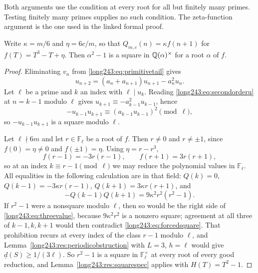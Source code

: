 \documentclass[11pt]{article}
\newcommand{\Fp}{\mathbb{F}}
\begin{document}
Both arguments use the condition at every root for all but finitely
many primes. Testing finitely many primes supplies no such condition.
The zeta-function argument is the one used in the linked formal proof.

\begin{proposition}\label{long243:res:transportsquare}
Write $\kappa=m/6$ and $\eta=6c/m$, so that $Q_{m,c}(n)=\kappa f(n+1)$ for
$f(T)=T^3-T+\eta$.  Then $\alpha^2-1$ is a square in $\mathbb{Q}(\alpha)^\times$ for a
root $\alpha$ of $f$.
\end{proposition}

\begin{proof}
Eliminating $v_n$ from \eqref{long243:eq:primitivetail} gives
\begin{equation}\label{long243:eq:secondorderu}
 u_{n+2}=(a_n+a_{n+1})u_{n+1}-a_n^2u_n .
\end{equation}
Let $\ell$ be a prime and $k$ an index with $\ell\mid u_k$.  Reading
\eqref{long243:eq:secondorderu} at $n=k-1$ modulo $\ell$ gives
$u_{k+1}\equiv-a_{k-1}^2u_{k-1}$, hence
\begin{equation}\label{long243:eq:forcedsquare}
 -u_{k-1}u_{k+1}\equiv(a_{k-1}u_{k-1})^2 \pmod\ell,
\end{equation}
so $-u_{k-1}u_{k+1}$ is a square modulo $\ell$.

Let $\ell\nmid6m$ and let $r\in\Fp_\ell$ be a root of $f$.  Then $r\ne0$ and
$r\ne\pm1$, since $f(0)=\eta\ne0$ and $f(\pm1)=\eta$.  Using $\eta=r-r^3$,
\[
 f(r-1)=-3r(r-1),\qquad f(r+1)=3r(r+1),
\]
so at an index $k\equiv r-1\pmod\ell$ we may reduce the polynomial values in
$\Fp_\ell$. All equalities in the following calculation are in that field:
$Q(k)=0$, $Q(k-1)=-3\kappa r(r-1)$, $Q(k+1)=3\kappa r(r+1)$, and
\begin{equation}\label{long243:eq:threevalue}
 -Q(k-1)Q(k+1)=9\kappa^2r^2(r^2-1).
\end{equation}
If $r^2-1$ were a nonsquare modulo $\ell$, then so would be the right side of
\eqref{long243:eq:threevalue}, because $9\kappa^2r^2$ is a nonzero square; agreement at
all three of $k-1,k,k+1$ would then contradict \eqref{long243:eq:forcedsquare}.  That
prohibition recurs at every index of the class $r-1$ modulo $\ell$, and
Lemma~\ref{long243:res:periodicobstruction} with $L=3$, $h=\ell$ would give
$\underline d(S)\ge1/(3\ell)$.  So $r^2-1$ is a square in $\Fp_\ell^\times$ at
every root of every good reduction, and Lemma~\ref{long243:res:squarespec} applies with
$H(T)=T^2-1$.
\end{proof}
\end{document}
